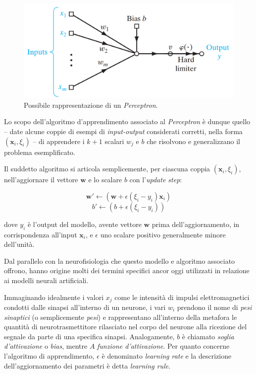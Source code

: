 \documentclass[a4paper, twoside]{article}
\begin{document}
\begin{figure}
	\includegraphics[width=0.94\linewidth]{perceptron.png}
	\captionsetup{labelformat=empty}
	\caption{Possibile rappresentazione di un \textit{Perceptron}.}
\end{figure}

Lo scopo dell'algoritmo d'apprendimento associato al \textit{Perceptron} è dunque quello -- date alcune coppie di esempi di \textit{input-output} considerati corretti, nella forma $\left( \boldsymbol{x}_i, \xi_i \right)$ --  di apprendere i $k+1$ scalari $w_j$ e $b$ che risolvono e generalizzano il problema esemplificato.

Il suddetto algoritmo si articola semplicemente, per ciascuna coppia $\left( \boldsymbol{x}_i, \xi_i \right)$, nell'aggiornare il vettore $\boldsymbol{w}$ e lo scalare $b$ con l'\textit{update step}:

$$
\boldsymbol{w'} \leftarrow \left( \boldsymbol{w} + \epsilon \left( \xi_i - y_i \right) \boldsymbol{x}_i  \right)
$$
$$
b' \leftarrow \left( b + \epsilon \left( \xi_i - y_i \right) \right)
$$

dove $y_i$ è l'output del modello, avente vettore $\boldsymbol{w}$ prima dell'aggiornamento, in corrispondenza all'input $\boldsymbol{x}_i$, e $\epsilon$ uno scalare positivo generalmente minore dell'unità.

Dal parallelo con la neurofisiologia che questo modello e algoritmo associato offrono, hanno origine molti dei termini specifici ancor oggi utilizzati in relazione ai modelli neurali artificiali.

Immaginando idealmente i valori $x_j$ come le intensità di impulsi elettromagnetici condotti dalle sinapsi all'interno di un neurone, i vari $w_i$ prendono il nome di \textit{pesi sinaptici} (o semplicemente \textit{pesi}) e rappresentano all'interno della metafora le quantità di neurotrasmettitore rilasciato nel corpo del neurone alla ricezione del segnale da parte di una specifica sinapsi. Analogamente, $b$ è chiamato \textit{soglia d'attivazione} o \textit{bias}, mentre $A$ \textit{funzione d'attivazione}. Per quanto concerne l'algoritmo di apprendimento, $\epsilon$ è denominato \textit{learning rate} e la descrizione dell'aggiornamento dei parametri è detta \textit{learning rule}.
\end{document}

